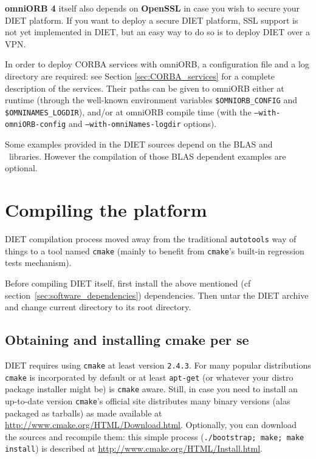 \textbf{omniORB 4} itself also depends on \textbf{OpenSSL} in case
you wish to secure your DIET platform.
If you want to deploy a secure DIET platform, SSL support is not yet
implemented  in DIET, but an easy way to do so is to deploy DIET over
a VPN.

In order to deploy CORBA services with omniORB, a configuration file
and a log directory are required: see Section
\ref{sec:CORBA_services} for a complete description of the services.
Their paths can be given to omniORB either at runtime (through the well-known
environment variables \texttt{\$OMNIORB\_CONFIG} and 
\texttt{\$OMNINAMES\_LOGDIR}), and/or at omniORB compile time (with the
\texttt{--with-omniORB-config} and \texttt{--with-omniNames-logdir}
options).

Some examples provided in the DIET sources depend on the BLAS
and \scalapack\ libraries. However the compilation of those BLAS dependent
examples are optional.


\section{Compiling the platform}
\label{sec:compil_platform}

DIET compilation process moved away from the traditional \verb+autotools+
way of things to a tool named \verb+cmake+ (mainly to benefit from
\verb+cmake+'s built-in regression tests mechanism).

Before compiling DIET itself, first install the above mentioned
(cf section~\ref{sec:software_dependencies}) dependencies.
Then untar the DIET archive and change current directory to its root directory.

\subsection{Obtaining and installing cmake per se}
DIET requires using \verb+cmake+ at least version \verb+2.4.3+.
For many popular distributions \verb+cmake+ is incorporated by
default or at least \verb+apt-get+ (or whatever your distro package installer
might be) is \verb+cmake+ aware.
Still, in case you need to install an up-to-date version \verb+cmake+'s
official site distributes many binary versions (alas packaged as tarballs)
as made available at 
\url{http://www.cmake.org/HTML/Download.html}.
Optionally, you can download the sources and recompile them: this simple
process (\verb+./bootstrap; make; make install+) is described at
\url{http://www.cmake.org/HTML/Install.html}.

